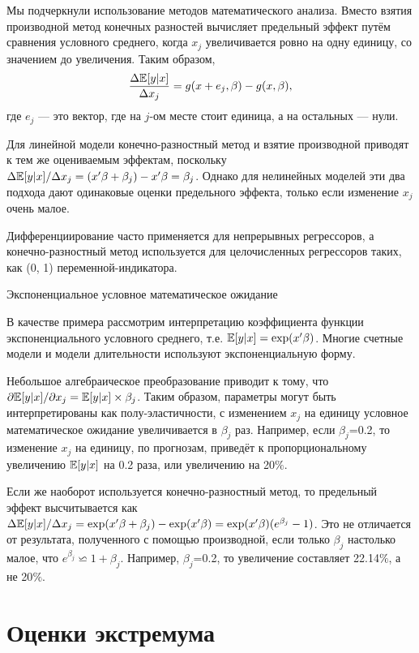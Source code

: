 Мы подчеркнули использование методов математического анализа. Вместо взятия производной метод конечных разностей вычисляет предельный эффект путём сравнения условного среднего, когда $x_j$ увеличивается ровно на одну единицу, со значением до увеличения. Таким образом,
\[
\frac{\Delta \mathbb{E}[y|x]}{ \Delta x_j}=g(x+e_j,\beta)-g(x,\beta),
\]
где $e_j$ --- это вектор, где на $j$-ом месте стоит единица, а на остальных --- нули.

Для линейной модели конечно-разностный метод и взятие производной приводят к тем же оцениваемым эффектам, поскольку $\Delta \mathbb{E}[y|x] / \Delta x_j = (x'\beta + \beta_j)-x'\beta = \beta_j$. Однако для нелинейных моделей эти два подхода дают одинаковые оценки предельного эффекта, только если изменение $x_j$ очень малое.

Дифференциирование часто применяется для непрерывных регрессоров, а конечно-разностный метод используется для целочисленных регрессоров таких, как (0, 1) переменной-индикатора.

\begin{center}
Экспоненциальное условное математическое ожидание
\end{center}

В качестве примера рассмотрим интерпретацию коэффициента функции экспоненциального условного среднего, т.е. $\mathbb{E}[y|x]= \exp(x'\beta)$. Многие счетные модели и модели длительности используют экспоненциальную форму.

Небольшое алгебраическое преобразование приводит к тому, что $\partial \mathbb{E}[y|x] / \partial x_j=\mathbb{E}[y|x]\times \beta_j$. Таким образом, параметры могут быть интерпретированы как полу-эластичности, с изменением $x_j$ на единицу условное математическое ожидание увеличивается в $\beta_j$ раз. Например, если $\beta_j$=0.2, то изменение $x_j$ на единицу, по прогнозам, приведёт к пропорциональному увеличению $\mathbb{E}[y|x]$ на 0.2 раза, или увеличению на 20$\%$.

Если же наоборот используется конечно-разностный метод, то предельный эффект высчитывается как $\Delta \mathbb{E}[y|x] / \Delta x_j = \exp(x'\beta + \beta_j)-\exp(x'\beta) = \exp(x'\beta)(e^{\beta_j}-1)$. Это не отличается от результата, полученного с помощью производной, если только $\beta_j$ настолько малое, что $e^{\beta_j} \backsimeq 1+\beta_j$. Например,  $\beta_j$=0.2, то увеличение составляет 22.14$\%$, а не 20$\%$.

\section{Оценки экстремума}

